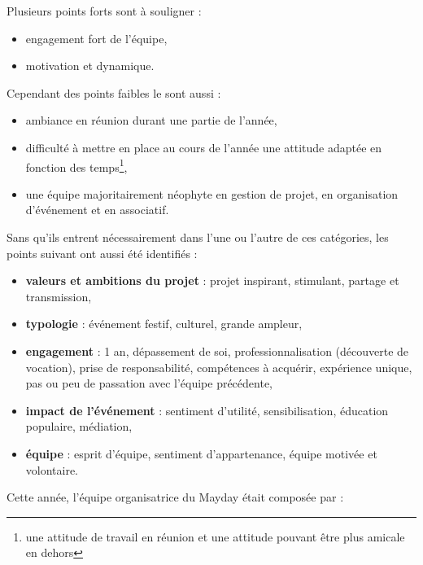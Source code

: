\documentclass[12pt,a4paper]{report}
\begin{document}
Plusieurs points forts sont à souligner : 
\begin{itemize}
\item engagement fort de l'équipe,
\item motivation et dynamique.\\
\end{itemize}

Cependant des points faibles le sont aussi : 
\begin{itemize}
\item ambiance en réunion durant une partie de l'année,
\item difficulté à mettre en place au cours de l’année une attitude adaptée en fonction des temps\footnote{une attitude de travail en réunion et une attitude pouvant être plus amicale en dehors},
\item une équipe majoritairement néophyte en gestion de projet, en organisation d’événement et en associatif.\\
\end{itemize}

Sans qu'ils entrent nécessairement dans l'une ou l'autre de ces catégories, les points suivant ont aussi été identifiés :
\begin{itemize}
\item \textbf{valeurs et ambitions du projet} : projet inspirant, stimulant, partage et transmission,
\item \textbf{typologie} : événement festif, culturel, grande ampleur,
\item \textbf{engagement} : 1 an, dépassement de soi, professionnalisation (découverte de vocation), prise de responsabilité, compétences à acquérir, expérience unique, pas ou peu de passation avec l'équipe précédente,
\item \textbf{impact de l'événement} : sentiment d'utilité, sensibilisation, éducation populaire, médiation,
\item \textbf{équipe} : esprit d'équipe, sentiment d'appartenance, équipe motivée et volontaire.\\
\end{itemize}

\newpage
Cette année, l'équipe organisatrice du Mayday était composée par :
\end{document}
